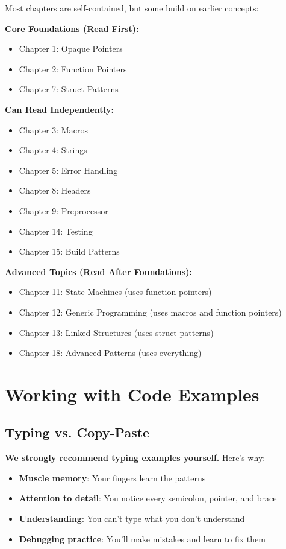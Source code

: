 \documentclass[11pt,openany]{book}
\begin{document}
Most chapters are self-contained, but some build on earlier concepts:

\textbf{Core Foundations (Read First):}
\begin{itemize}
    \item Chapter 1: Opaque Pointers
    \item Chapter 2: Function Pointers
    \item Chapter 7: Struct Patterns
\end{itemize}

\textbf{Can Read Independently:}
\begin{itemize}
    \item Chapter 3: Macros
    \item Chapter 4: Strings
    \item Chapter 5: Error Handling
    \item Chapter 8: Headers
    \item Chapter 9: Preprocessor
    \item Chapter 14: Testing
    \item Chapter 15: Build Patterns
\end{itemize}

\textbf{Advanced Topics (Read After Foundations):}
\begin{itemize}
    \item Chapter 11: State Machines (uses function pointers)
    \item Chapter 12: Generic Programming (uses macros and function pointers)
    \item Chapter 13: Linked Structures (uses struct patterns)
    \item Chapter 18: Advanced Patterns (uses everything)
\end{itemize}

\section*{Working with Code Examples}

\subsection*{Typing vs. Copy-Paste}

\textbf{We strongly recommend typing examples yourself.} Here's why:

\begin{itemize}
    \item \textbf{Muscle memory}: Your fingers learn the patterns
    \item \textbf{Attention to detail}: You notice every semicolon, pointer, and brace
    \item \textbf{Understanding}: You can't type what you don't understand
    \item \textbf{Debugging practice}: You'll make mistakes and learn to fix them
\end{itemize}
\end{document}
